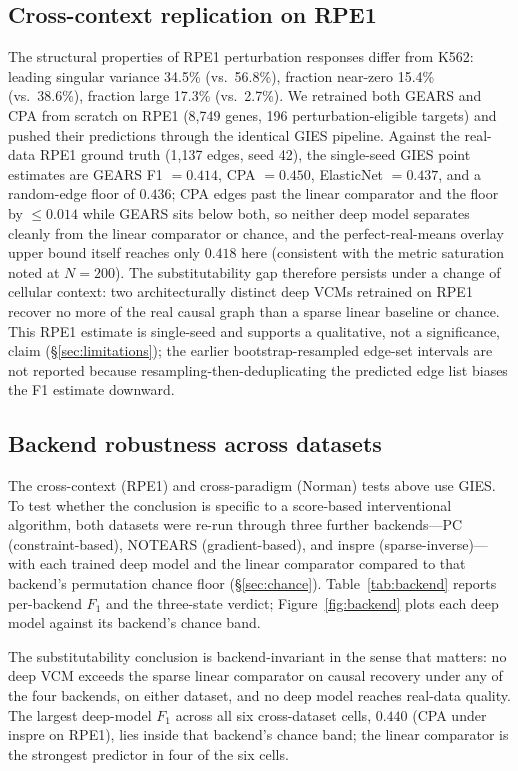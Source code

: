 \documentclass{article}
\theoremstyle{plain}
\theoremstyle{definition}
\theoremstyle{remark}
\begin{document}
\subsection{Cross-context replication on RPE1}
The structural properties of RPE1 perturbation responses differ from K562: leading singular variance 34.5\% (vs.\ 56.8\%), fraction near-zero 15.4\% (vs.\ 38.6\%), fraction large 17.3\% (vs.\ 2.7\%). We retrained both GEARS and CPA from scratch on RPE1 (8{,}749 genes, 196 perturbation-eligible targets) and pushed their predictions through the identical GIES pipeline. Against the real-data RPE1 ground truth (1{,}137 edges, seed 42), the single-seed GIES point estimates are GEARS F1 $= 0.414$, CPA $= 0.450$, ElasticNet $= 0.437$, and a random-edge floor of $0.436$; CPA edges past the linear comparator and the floor by $\leq 0.014$ while GEARS sits below both, so neither deep model separates cleanly from the linear comparator or chance, and the perfect-real-means overlay upper bound itself reaches only $0.418$ here (consistent with the metric saturation noted at $N{=}200$). The substitutability gap therefore persists under a change of cellular context: two architecturally distinct deep VCMs retrained on RPE1 recover no more of the real causal graph than a sparse linear baseline or chance. This RPE1 estimate is single-seed and supports a qualitative, not a significance, claim (\S\ref{sec:limitations}); the earlier bootstrap-resampled edge-set intervals are not reported because resampling-then-deduplicating the predicted edge list biases the F1 estimate downward.

\subsection{Backend robustness across datasets}
\label{sec:backend-robustness}
The cross-context (RPE1) and cross-paradigm (Norman) tests above use GIES. To test whether the conclusion is specific to a score-based interventional algorithm, both datasets were re-run through three further backends---PC (constraint-based), NOTEARS (gradient-based), and inspre (sparse-inverse)---with each trained deep model and the linear comparator compared to that backend's permutation chance floor (\S\ref{sec:chance}). Table~\ref{tab:backend} reports per-backend $F_1$ and the three-state verdict; Figure~\ref{fig:backend} plots each deep model against its backend's chance band.

The substitutability conclusion is backend-invariant in the sense that matters: no deep VCM exceeds the sparse linear comparator on causal recovery under any of the four backends, on either dataset, and no deep model reaches real-data quality. The largest deep-model $F_1$ across all six cross-dataset cells, $0.440$ (CPA under inspre on RPE1), lies inside that backend's chance band; the linear comparator is the strongest predictor in four of the six cells.
\end{document}
